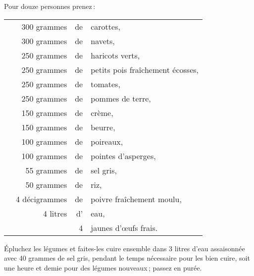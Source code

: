 Pour douze personnes prenez :

\medskip

\footnotesize
\begin{longtable}{rrrrp{16em}}   
  &  \multicolumn{2}{r}{ 300 grammes}  & de & carottes,                                                   \\
  &  \multicolumn{2}{r}{ 300 grammes}  & de & navets,                                                     \\
  &  \multicolumn{2}{r}{ 250 grammes}  & de & haricots verts,                                             \\
  &  \multicolumn{2}{r}{ 250 grammes}  & de & petits pois fraîchement écosses,                            \\
  &  \multicolumn{2}{r}{ 250 grammes}  & de & tomates,                                                    \\
  &  \multicolumn{2}{r}{ 250 grammes}  & de & pommes de terre,                                            \\
  &  \multicolumn{2}{r}{ 150 grammes}  & de & crème,                                                      \\
  &  \multicolumn{2}{r}{ 150 grammes}  & de & beurre,                                                     \\
  &  \multicolumn{2}{r}{ 100 grammes}  & de & poireaux,                                                   \\
  &  \multicolumn{2}{r}{ 100 grammes}  & de & pointes d'asperges,                                         \\
  &  \multicolumn{2}{r}{  55 grammes}  & de & sel gris,                                                   \\
  &  \multicolumn{2}{r}{  50 grammes}  & de & riz,                                                        \\
  & \multicolumn{2}{r}{4 décigrammes} & de & poivre fraîchement moulu,                                    \\
  &                       &  4 litres & d' & eau,                                                         \\
  &                       &           &  4 & jaunes d'œufs frais.                                         \\
\end{longtable}
\normalsize                      

Épluchez les légumes et faites-les cuire ensemble dans 3 litres d’eau
assaisonnée avec 40 grammes de sel gris, pendant le temps nécessaire pour les
bien cuire, soit une heure et demie pour des légumes nouveaux ; passez en purée.

